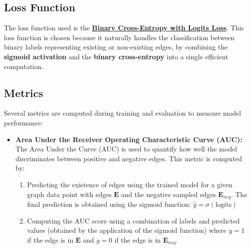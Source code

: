 \documentclass[11pt]{article}
\begin{document}
	\subsection{Loss Function}
	The loss function used is the \href{https://pytorch.org/docs/stable/generated/torch.nn.BCEWithLogitsLoss.html#bcewithlogitsloss}{\textbf{Binary Cross-Entropy with Logits Loss}}. This loss function is chosen because it naturally handles the classification between binary labels representing existing or non-existing edges, by combining the \textbf{sigmoid activation} and the \textbf{binary cross-entropy} into a single efficient computation.
	
	\subsection{Metrics}
	Several metrics are computed during training and evaluation to measure model performance:
	\begin{itemize}
		\item \textbf{Area Under the Receiver Operating Characteristic Curve (AUC):}
		The Area Under the Curve (AUC) is used to quantify how well the model discriminates between positive and negative edges. This metric is computed by:
		
		\begin{enumerate}
			\item Predicting the existence of edges using the trained model for a given graph data point with edges $\mathbf{E}$ and the negative sampled edges $\mathbf{E}_{neg}$. The final prediction is obtained using the sigmoid function: $\hat{y} = \sigma(\text{logits})$
			
			\item Computing the AUC score using a combination of labels and predicted values (obtained by the application of the sigmoid function) where $y=1$ if the edge is in $\mathbf{E}$ and $y=0$ if the edge is in $\mathbf{E}_{neg}$.
		\end{enumerate}
	\end{itemize}
	
\end{document}
